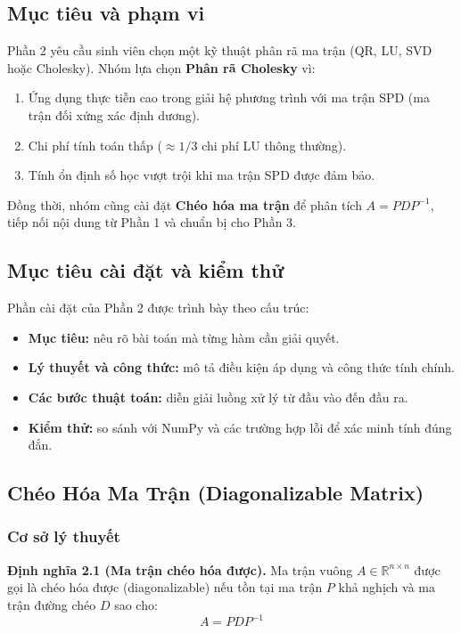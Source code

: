 \documentclass[a4paper]{article}
\begin{document}
\subsection{Mục tiêu và phạm vi}

Phần 2 yêu cầu sinh viên chọn một kỹ thuật phân rã ma trận (QR, LU, SVD hoặc Cholesky). Nhóm lựa chọn \textbf{Phân rã Cholesky} vì:
\begin{enumerate}
    \item Ứng dụng thực tiễn cao trong giải hệ phương trình với ma trận SPD (ma trận đối xứng xác định dương).
    \item Chi phí tính toán thấp ($\approx 1/3$ chi phí LU thông thường).
    \item Tính ổn định số học vượt trội khi ma trận SPD được đảm bảo.
\end{enumerate}

Đồng thời, nhóm cũng cài đặt \textbf{Chéo hóa ma trận} để phân tích $A = PDP^{-1}$, tiếp nối nội dung từ Phần 1 và chuẩn bị cho Phần 3.

\subsection{Mục tiêu cài đặt và kiểm thử}

Phần cài đặt của Phần 2 được trình bày theo cấu trúc:
\begin{itemize}
    \item \textbf{Mục tiêu:} nêu rõ bài toán mà từng hàm cần giải quyết.
    \item \textbf{Lý thuyết và công thức:} mô tả điều kiện áp dụng và công thức tính chính.
    \item \textbf{Các bước thuật toán:} diễn giải luồng xử lý từ đầu vào đến đầu ra.
    \item \textbf{Kiểm thử:} so sánh với NumPy và các trường hợp lỗi để xác minh tính đúng đắn.
\end{itemize}

\subsection{Chéo Hóa Ma Trận (Diagonalizable Matrix)}

\subsubsection{Cơ sở lý thuyết}

\textbf{Định nghĩa 2.1 (Ma trận chéo hóa được).} Ma trận vuông $A \in \mathbb{R}^{n \times n}$ được gọi là chéo hóa được (diagonalizable) nếu tồn tại ma trận $P$ khả nghịch và ma trận đường chéo $D$ sao cho:
$$A = PDP^{-1}$$
\end{document}
